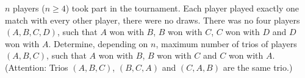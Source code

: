 $n$ players ($n \ge 4$) took part in the tournament. Each player played exactly one match with every other player, there were no draws. There was no four players $(A, B, C, D)$, such that $A$ won with $B$, $B$ won with $C$, $C$ won with $D$ and $D$ won with $A$. Determine, depending on $n$, maximum number of trios of players $(A, B, C)$, such that  $A$ won with $B$, $B$ won with $C$ and $C$ won with $A$.
(Attention: Trios $(A, B, C)$, $(B, C, A)$ and $(C, A, B)$ are the same trio.)